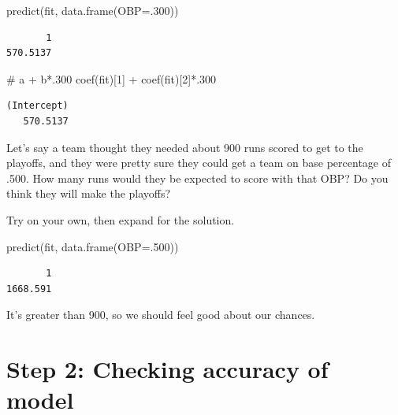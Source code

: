 \documentclass[
  letterpaper,
  DIV=11,
  numbers=noendperiod]{scrreprt}
\newenvironment{Shaded}{\begin{snugshade}}{\end{snugshade}}
\newcommand{\AttributeTok}[1]{\textcolor[rgb]{0.40,0.45,0.13}{#1}}
\newcommand{\CommentTok}[1]{\textcolor[rgb]{0.37,0.37,0.37}{#1}}
\newcommand{\DecValTok}[1]{\textcolor[rgb]{0.68,0.00,0.00}{#1}}
\newcommand{\FunctionTok}[1]{\textcolor[rgb]{0.28,0.35,0.67}{#1}}
\newcommand{\NormalTok}[1]{\textcolor[rgb]{0.00,0.23,0.31}{#1}}
\newcommand{\SpecialCharTok}[1]{\textcolor[rgb]{0.37,0.37,0.37}{#1}}
\begin{document}
\begin{Shaded}
\begin{Highlighting}[]
\FunctionTok{predict}\NormalTok{(fit, }\FunctionTok{data.frame}\NormalTok{(}\AttributeTok{OBP=}\NormalTok{.}\DecValTok{300}\NormalTok{))}
\end{Highlighting}
\end{Shaded}

\begin{verbatim}
       1 
570.5137 
\end{verbatim}

\begin{Shaded}
\begin{Highlighting}[]
\CommentTok{\# a + b*.300}
\FunctionTok{coef}\NormalTok{(fit)[}\DecValTok{1}\NormalTok{] }\SpecialCharTok{+}  \FunctionTok{coef}\NormalTok{(fit)[}\DecValTok{2}\NormalTok{]}\SpecialCharTok{*}\NormalTok{.}\DecValTok{300}
\end{Highlighting}
\end{Shaded}

\begin{verbatim}
(Intercept) 
   570.5137 
\end{verbatim}

Let's say a team thought they needed about 900 runs scored to get to the
playoffs, and they were pretty sure they could get a team on base
percentage of .500. How many runs would they be expected to score with
that OBP? Do you think they will make the playoffs?

Try on your own, then expand for the solution.

\begin{Shaded}
\begin{Highlighting}[]
\FunctionTok{predict}\NormalTok{(fit, }\FunctionTok{data.frame}\NormalTok{(}\AttributeTok{OBP=}\NormalTok{.}\DecValTok{500}\NormalTok{))}
\end{Highlighting}
\end{Shaded}

\begin{verbatim}
       1 
1668.591 
\end{verbatim}

It's greater than 900, so we should feel good about our chances.

\hypertarget{step-2-checking-accuracy-of-model}{%
\section{Step 2: Checking accuracy of
model}\label{step-2-checking-accuracy-of-model}}
\end{document}
